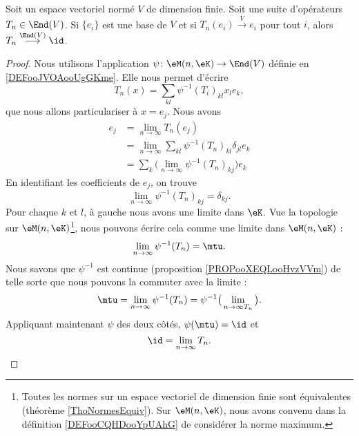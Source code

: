 \begin{proposition}     \label{PROPooDRHMooYzXbkl}
    Soit un espace vectoriel normé \( V\) de dimension finie. Soit une suite d'opérateurs \( T_n\in \End(V)\). Si \( \{ e_i \}\) est une base de \( V\) et si \( T_n(e_i)\stackrel{V}{\longrightarrow}e_i\) pour tout \( i\), alors \( T_n\stackrel{\End(V)}{\longrightarrow}\id\).
\end{proposition}

\begin{proof}
    Nous utilisons l'application \( \psi\colon \eM(n,\eK)\to \End(V)\) définie en \ref{DEFooJVOAooUgGKme}. Elle nous permet d'écrire
    \begin{equation}
        T_n(x)=\sum_{kl}\psi^{-1}(T_i)_{kl}x_le_k,
    \end{equation}
    que nous allons particulariser à \( x=e_j\). Nous avons
    \begin{subequations}
        \begin{align}
            e_j&=\lim_{n\to \infty} T_n(e_j)\\
            &=\lim_{n\to \infty} \sum_{kl}\psi^{-1}(T_n)_{kl}\delta_{jl}e_k\\
            &=\sum_{k}\big( \lim_{n\to \infty} \psi^{-1}(T_n)_{kj} \big)e_k
        \end{align}
    \end{subequations}
    En identifiant les coefficients de \( e_j\), on trouve
    \begin{equation}
        \lim_{n\to \infty} \psi^{-1}(T_n)_{kj}=\delta_{kj}.
    \end{equation}
    Pour chaque \( k\) et \( l\), à gauche nous avons une limite dans \( \eK\). Vue la topologie sur \( \eM(n,\eK)\)\footnote{Toutes les normes sur un espace vectoriel de dimension finie sont équivalentes (théorème \ref{ThoNormesEquiv}). Sur \( \eM(n,\eK)\), nous avons convenu dans la définition \ref{DEFooCQHDooYpUAhG} de considérer la norme maximum.}, nous pouvons écrire cela comme une limite dans \( \eM(n,\eK)\) :
    \begin{equation}
        \lim_{n\to \infty} \psi^{-1}(T_n)=\mtu.
    \end{equation}
    Nous savons que \( \psi^{-1}\) est continue (proposition \ref{PROPooXEQLooHvzVVm}) de telle sorte que nous pouvons la commuter avec la limite :
    \begin{equation}
        \mtu= \lim_{n\to \infty} \psi^{-1}(T_n)=\psi^{-1}\big( \lim_{n\to \infty T_n}  \big).
    \end{equation}
    Appliquant maintenant \( \psi\) des deux côtés, \( \psi(\mtu)=\id\) et
    \begin{equation}
        \id=\lim_{n\to \infty} T_n.
    \end{equation}
\end{proof}

